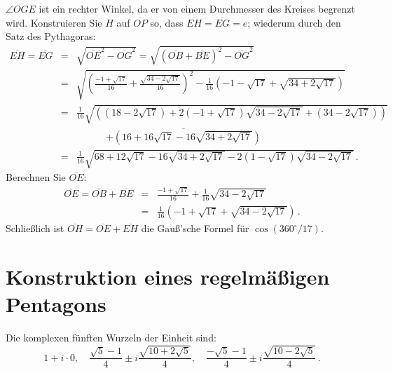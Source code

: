 $\angle OGE$ ist ein rechter Winkel, da er von einem Durchmesser des Kreises begrenzt wird. Konstruieren Sie $H$ auf $\overline{OP}$ so, dass $\overline{EH}=\overline{EG}=e$; wiederum durch den Satz des Pythagoras:
\begin{eqnarray*}
\overline{EH}=\overline{EG}&=&\sqrt{\overline{OE}^2-\overline{OG}^2}=\sqrt{(\overline{OB}+\overline{BE})^2-\overline{OG}^2}\\
&=&\sqrt{\left(\frac{-1+\sqrt{17}}{16}+\frac{\sqrt{34-2\sqrt{17}}}{16}\right)^2-
\frac{1}{16}\left(-1-\sqrt{17}+\sqrt{34+2\sqrt{17}}\right)}
\\
&=&\frac{1}{16}\sqrt{\left(
(18-2\sqrt{17})+ 2(-1+\sqrt{17})\sqrt{34-2\sqrt{17}}+
(34-2\sqrt{17})\right)}\\
&&\quad\quad\quad\overline{
+\left(16+16\sqrt{17}-16\sqrt{34+2\sqrt{17}}\right)}\\
&=&\frac{1}{16}\sqrt{
68+12\sqrt{17}-16\sqrt{34+2\sqrt{17}}-2(1-\sqrt{17})\sqrt{34-2\sqrt{17}}
}\,.
\end{eqnarray*}
Berechnen Sie $\overline{OE}$:
\begin{eqnarray*}
\overline{OE}=\overline{OB}+\overline{BE}&=&\frac{-1+\sqrt{17}}{16}+\frac{1}{16}\sqrt{34-2\sqrt{17}}\\
&=&\frac{1}{16}\left(-1+\sqrt{17}+\sqrt{34-2\sqrt{17}}\right)\,.
\end{eqnarray*}
Schließlich ist $\overline{OH}=\overline{OE}+\overline{EH}$ die Gauß'sche Formel für $\cos (360^\circ/17)$.

\section{Konstruktion eines regelmäßigen Pentagons}\label{s.hept-pentagon}


\begin{advanced}
Die komplexen fünften Wurzeln der Einheit sind:
\[
1+i\cdot 0,\quad\frac{\sqrt{5}-1}{4}\pm i \frac{\sqrt{10+2\sqrt{5}}}{4},\quad\frac{-\sqrt{5}-1}{4}\pm i \frac{\sqrt{10-2\sqrt{5}}}{4}\,.
\]
\end{advanced}

